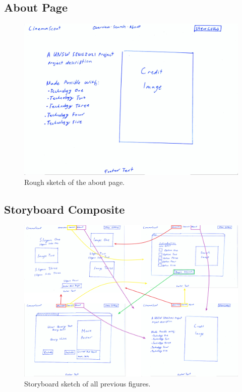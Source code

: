\documentclass{article}
\begin{document}
\subsection{About Page}
\begin{figure}[H]
\includegraphics[width=\columnwidth]{res/credits.jpg}
\caption{Rough sketch of the about page.}
\end{figure}
\subsection{Storyboard Composite}
\begin{figure}[H]
\includegraphics[width=\columnwidth]{res/arrows_new.png}
\caption{Storyboard sketch of all previous figures.}
\end{figure}
\end{document}
